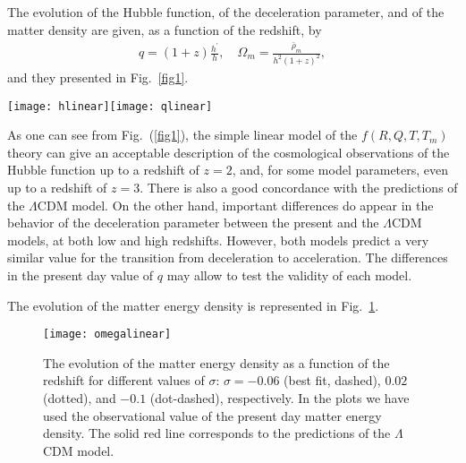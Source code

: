 \documentclass[aps,superscriptaddress, showpacs,preprintnumbers, superscriptaddress, nofootinbibt,twocolumn]{revtex4}
\begin{document}
The evolution of the Hubble function, of the deceleration parameter, and of the matter density are given, as a function of the redshift, by
\begin{align}
q=(1+z)\frac{h^\prime}{h},\quad \Omega_m=\frac{\bar\rho_m}{h^2(1+z)^2},
\end{align}
and they presented in Fig.~\ref{fig1}.

\begin{figure*}[ht]
	\centering
	\texttt{[image: hlinear]}\texttt{[image: qlinear]}
	\caption{The evolution of the Hubble function $(1+z)h$  (left panel), and of the deceleration parameter $q$ (right panel)  as a function of redshift for different values of $\sigma$: $\sigma=-0.06$ (best fit, dashed), $0.02$ (dotted), and  $-0.1$ (dot-dashed), respectively. To obtain the plots we have used the best fit values for the Hubble parameter. The solid red line corresponds to the $\Lambda$CDM model.  The error bars indicate the observational values \cite{hubble}.}\label{fig1}
\end{figure*}

As one can see from Fig.~(\ref{fig1}), the simple linear model of the $f\left(R,Q,T,T_m\right)$ theory can give an acceptable description of the cosmological observations of the Hubble function up to a redshift of $z=2$, and, for some model parameters, even up to a redshift of $z=3$. There is also a good concordance with the predictions of the $\Lambda$CDM model. On the other hand, important differences do appear in the behavior of the deceleration parameter between the present and the $\Lambda$CDM models, at both low and high redshifts. However, both models predict a very similar value for the transition from deceleration to acceleration. The differences in the present day value of $q$ may allow to test the validity of each model.

The evolution of the matter energy density is represented in Fig.~\ref{fig1a}.

\begin{figure}[ht]
\centering
\texttt{[image: omegalinear]}
\caption{\label{fig1a}The evolution of the matter energy density  as a function of the redshift for different values of $\sigma$: $\sigma=-0.06$ (best fit, dashed), $0.02$ (dotted), and $-0.1$ (dot-dashed), respectively. In the plots we have used the observational value of the present day matter energy density. The solid red line corresponds to the predictions of the $\Lambda$CDM model. }
\end{figure}
\end{document}
